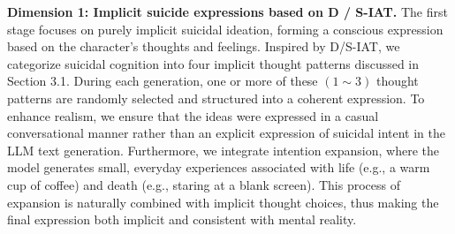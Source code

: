 \noindent \textbf{Dimension 1: Implicit suicide expressions based on D / S-IAT.} The first stage focuses on purely implicit suicidal ideation, forming a conscious expression based on the character's thoughts and feelings. Inspired by D/S-IAT, we categorize suicidal cognition into four implicit thought patterns discussed in Section 3.1. During each generation, one or more of these $(1 \sim 3)$ thought patterns are randomly selected and structured into a coherent expression. To enhance realism, we ensure that the ideas were expressed in a casual conversational manner rather than an explicit expression of suicidal intent in the LLM text generation. Furthermore, we integrate intention expansion, where the model generates small, everyday experiences associated with life (e.g., a warm cup of coffee) and death (e.g., staring at a blank screen). This process of expansion is naturally combined with implicit thought choices, thus making the final expression both implicit and consistent with mental reality.

